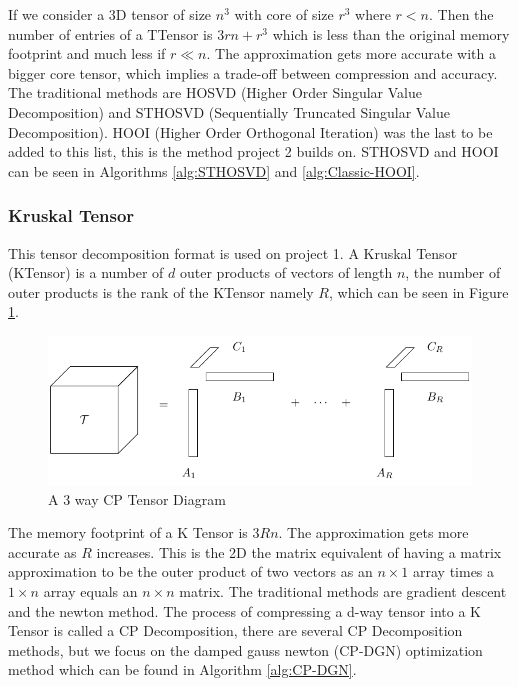 \documentclass[MS]{wfuthesis}
\begin{document}
                    If we consider a 3D tensor of size $n^3$ with core of size $r^3$ where $r < n$. Then the number of entries of a TTensor is $3rn + r^3$ which is less than the original memory footprint and much less if $r \ll n$. The approximation gets more accurate with a bigger core tensor, which implies a trade-off between compression and accuracy. The traditional methods are HOSVD (Higher Order Singular Value Decomposition) and STHOSVD (Sequentially Truncated Singular Value Decomposition). HOOI (Higher Order Orthogonal Iteration) was the last to be added to this list, this is the method project 2 builds on. STHOSVD and HOOI can be seen in Algorithms \ref{alg:STHOSVD} and \ref{alg:Classic-HOOI}.
                    
                
                \subsubsection{Kruskal Tensor}
                    This tensor decomposition format is used on project 1. A Kruskal Tensor (KTensor) is a number of $d$ outer products of vectors of length $n$, the number of outer products is the rank of the KTensor namely $R$, which can be seen in Figure \ref{fig:KTensor}.
                    \begin{figure}[ht]
                        \centering
                        \includegraphics[scale=1]{tikz/CP_Tensor.pdf}
                        \caption{A 3 way CP Tensor Diagram}
                        \label{fig:KTensor}
                    \end{figure}
                    The memory footprint of a K Tensor is $3Rn$. The approximation gets more accurate as $R$ increases. This is the 2D the matrix equivalent of having a matrix approximation to be the outer product of two vectors as an $n \times 1$ array times a $1 \times n$ array equals an $n \times n$ matrix. The traditional methods are gradient descent and the newton method. The process of compressing a d-way tensor into a K Tensor is called a CP Decomposition, there are several CP Decomposition methods, but we focus on the damped gauss newton (CP-DGN) optimization method which can be found in Algorithm \ref{alg:CP-DGN}.
\end{document}
